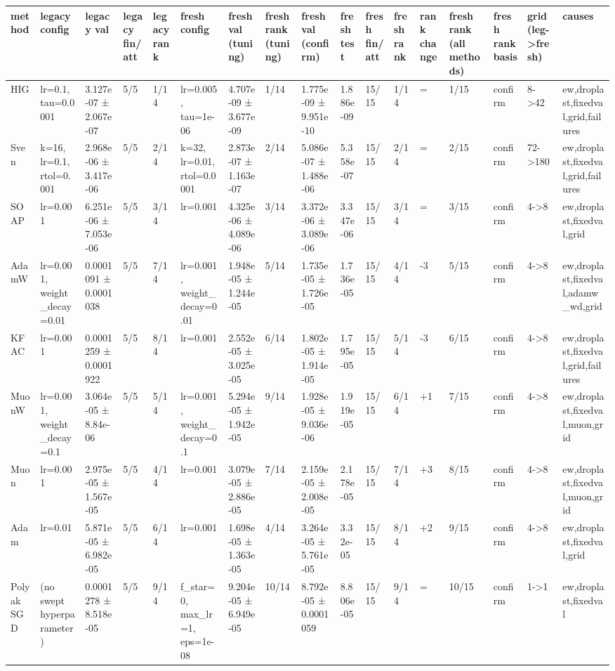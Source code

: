 \begin{tabular}{lllllllllllllllll}
\toprule
method & legacy config & legacy val & legacy fin/att & legacy rank & fresh config & fresh val (tuning) & fresh rank (tuning) & fresh val (confirm) & fresh test & fresh fin/att & fresh rank & rank change & fresh rank (all methods) & fresh rank basis & grid (leg->fresh) & causes \\
\midrule
HIG & lr=0.1, tau=0.0001 & 3.127e-07 ± 2.067e-07 & 5/5 & 1/14 & lr=0.005, tau=1e-06 & 4.707e-09 ± 3.677e-09 & 1/14 & 1.775e-09 ± 9.951e-10 & 1.886e-09 & 15/15 & 1/14 & = & 1/15 & confirm & 8->42 & ew,droplast,fixedval,grid,failures \\
Sven & k=16, lr=0.1, rtol=0.001 & 2.968e-06 ± 3.417e-06 & 5/5 & 2/14 & k=32, lr=0.01, rtol=0.0001 & 2.873e-07 ± 1.163e-07 & 2/14 & 5.086e-07 ± 1.488e-06 & 5.358e-07 & 15/15 & 2/14 & = & 2/15 & confirm & 72->180 & ew,droplast,fixedval,grid,failures \\
SOAP & lr=0.001 & 6.251e-06 ± 7.053e-06 & 5/5 & 3/14 & lr=0.001 & 4.325e-06 ± 4.089e-06 & 3/14 & 3.372e-06 ± 3.089e-06 & 3.347e-06 & 15/15 & 3/14 & = & 3/15 & confirm & 4->8 & ew,droplast,fixedval,grid \\
AdamW & lr=0.001, weight\_decay=0.01 & 0.0001091 ± 0.0001038 & 5/5 & 7/14 & lr=0.001, weight\_decay=0.01 & 1.948e-05 ± 1.244e-05 & 5/14 & 1.735e-05 ± 1.726e-05 & 1.736e-05 & 15/15 & 4/14 & -3 & 5/15 & confirm & 4->8 & ew,droplast,fixedval,adamw\_wd,grid \\
KFAC & lr=0.001 & 0.0001259 ± 0.0001922 & 5/5 & 8/14 & lr=0.001 & 2.552e-05 ± 3.025e-05 & 6/14 & 1.802e-05 ± 1.914e-05 & 1.795e-05 & 15/15 & 5/14 & -3 & 6/15 & confirm & 4->8 & ew,droplast,fixedval,grid,failures \\
MuonW & lr=0.001, weight\_decay=0.1 & 3.064e-05 ± 8.84e-06 & 5/5 & 5/14 & lr=0.001, weight\_decay=0.1 & 5.294e-05 ± 1.942e-05 & 9/14 & 1.928e-05 ± 9.036e-06 & 1.919e-05 & 15/15 & 6/14 & +1 & 7/15 & confirm & 4->8 & ew,droplast,fixedval,muon,grid \\
Muon & lr=0.001 & 2.975e-05 ± 1.567e-05 & 5/5 & 4/14 & lr=0.001 & 3.079e-05 ± 2.886e-05 & 7/14 & 2.159e-05 ± 2.008e-05 & 2.178e-05 & 15/15 & 7/14 & +3 & 8/15 & confirm & 4->8 & ew,droplast,fixedval,muon,grid \\
Adam & lr=0.01 & 5.871e-05 ± 6.982e-05 & 5/5 & 6/14 & lr=0.001 & 1.698e-05 ± 1.363e-05 & 4/14 & 3.264e-05 ± 5.761e-05 & 3.32e-05 & 15/15 & 8/14 & +2 & 9/15 & confirm & 4->8 & ew,droplast,fixedval,grid \\
Polyak SGD & (no swept hyperparameter) & 0.0001278 ± 8.518e-05 & 5/5 & 9/14 & f\_star=0, max\_lr=1, eps=1e-08 & 9.204e-05 ± 6.949e-05 & 10/14 & 8.792e-05 ± 0.0001059 & 8.806e-05 & 15/15 & 9/14 & = & 10/15 & confirm & 1->1 & ew,droplast,fixedval \\

\end{tabular}

